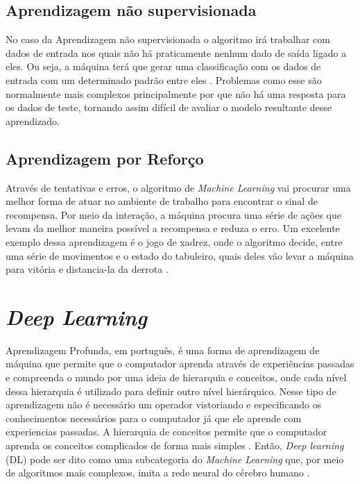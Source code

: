 \subsection{Aprendizagem não supervisionada}
\label{Aprendizagem não supervisionada}
No caso da Aprendizagem não supervisionada o algoritmo irá trabalhar com dados de entrada nos quais não há praticamente nenhum dado de saída ligado a eles. Ou seja, a máquina terá que gerar uma classificação com os dados de entrada com um determinado padrão entre eles \cite{pythonmachinelearning}. Problemas como esse são normalmente mais complexos principalmente por que não há uma resposta para os dados de teste, tornando assim difícil de avaliar o modelo resultante desse aprendizado.

\subsection{Aprendizagem por Reforço}
\label{Aprendizagem por Reforço}
Através de tentativas e erros, o algoritmo de \textit{Machine Learning} vai procurar uma melhor forma de atuar no ambiente de trabalho para encontrar o sinal de recompensa. Por meio da interação, a máquina procura uma série de ações que levam da melhor maneira possível a recompensa e reduza o erro. Um excelente exemplo dessa aprendizagem é o jogo de xadrez, onde o algoritmo decide, entre uma série de movimentos e o estado do tabuleiro, quais deles vão levar a máquina para vitória e distancia-la da derrota \cite{pythonmachinelearning}.

\section{\textit{Deep Learning}}
\label{deep learning}

Aprendizagem Profunda, em português, é uma forma de aprendizagem de máquina que permite que o computador aprenda através de experiências passadas e compreenda o mundo por uma ideia de hierarquia e conceitos, onde cada nível dessa hierarquia é utilizado para definir outro nível hierárquico. Nesse tipo de aprendizagem não é necessário um operador vistoriando e especificando os conhecimentos necessários para o computador já que ele aprende com experiencias passadas. A hierarquia de conceitos permite que o computador aprenda os conceitos complicados de forma mais simples \cite{goodfellow2016deep}. Então, \textit{Deep learning} (DL) pode ser dito como uma subcategoria do \textit{Machine Learning} que, por meio de algoritmos mais complexos, imita a rede neural do cérebro humano \cite{diferencamachinelearning}.

